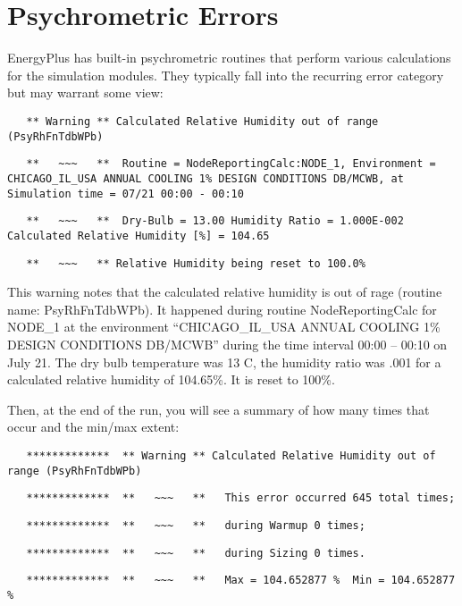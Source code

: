 \section{Psychrometric Errors}\label{psychrometric-errors}

EnergyPlus has built-in psychrometric routines that perform various calculations for the simulation modules. They typically fall into the recurring error category but may warrant some view:

\begin{lstlisting}
   ** Warning ** Calculated Relative Humidity out of range (PsyRhFnTdbWPb)
\end{lstlisting}

\begin{lstlisting}
   **   ~~~   **  Routine = NodeReportingCalc:NODE_1, Environment = CHICAGO_IL_USA ANNUAL COOLING 1% DESIGN CONDITIONS DB/MCWB, at Simulation time = 07/21 00:00 - 00:10
\end{lstlisting}

\begin{lstlisting}
   **   ~~~   **  Dry-Bulb = 13.00 Humidity Ratio = 1.000E-002 Calculated Relative Humidity [%] = 104.65
\end{lstlisting}

\begin{lstlisting}
   **   ~~~   ** Relative Humidity being reset to 100.0%
\end{lstlisting}

This warning notes that the calculated relative humidity is out of rage (routine name: PsyRhFnTdbWPb). It happened during routine NodeReportingCalc for NODE\_1 at the environment ``CHICAGO\_IL\_USA ANNUAL COOLING 1\% DESIGN CONDITIONS DB/MCWB'' during the time interval 00:00 -- 00:10 on July 21. The dry bulb temperature was 13 C, the humidity ratio was .001 for a calculated relative humidity of 104.65\%. It is reset to 100\%.

Then, at the end of the run, you will see a summary of how many times that occur and the min/max extent:

\begin{lstlisting}
   *************  ** Warning ** Calculated Relative Humidity out of range (PsyRhFnTdbWPb)
\end{lstlisting}

\begin{lstlisting}
   *************  **   ~~~   **   This error occurred 645 total times;
\end{lstlisting}

\begin{lstlisting}
   *************  **   ~~~   **   during Warmup 0 times;
\end{lstlisting}

\begin{lstlisting}
   *************  **   ~~~   **   during Sizing 0 times.
\end{lstlisting}

\begin{lstlisting}
   *************  **   ~~~   **   Max = 104.652877 %  Min = 104.652877 %
\end{lstlisting}
